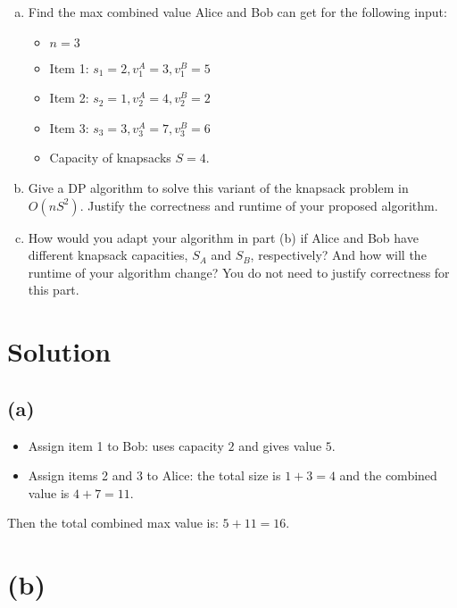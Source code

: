 \documentclass[11pt]{article}
\begin{document}
\begin{tcolorbox}[title={Problem 1 (Knapsack, Take II, 50 pts)}]
        \begin{enumerate}[(a)]
            \item Find the max combined value Alice and Bob can get for the following input:
            \begin{itemize}
                \item \( n = 3 \)
                \item Item 1: \( s_1 = 2, v_1^A = 3, v_1^B = 5 \)
                \item Item 2: \( s_2 = 1, v_2^A = 4, v_2^B = 2 \)
                \item Item 3: \( s_3 = 3, v_3^A = 7, v_3^B = 6 \)
                \item Capacity of knapsacks \(S = 4\).
            \end{itemize} 
            \item Give a DP algorithm to solve this variant of the knapsack problem in $O(nS^2)$. Justify the correctness and runtime of your proposed algorithm. 
            \item How would you adapt your algorithm in part (b) if Alice and Bob have different knapsack capacities, \(S_A\) and \(S_B\), respectively? And how will the runtime of your algorithm change? You do not need to justify correctness for this part.
        \end{enumerate}
    \end{tcolorbox}

    \section*{Solution}

    \subsection*{(a)}
    \begin{itemize}
        \item Assign item 1 to Bob: uses capacity \(2\) and gives value \(5\).
        \item Assign items 2 and 3 to Alice: the total size is \(1+3=4\) and the combined value is \(4+7=11\).
    \end{itemize}
    Then the total combined max value is: \(5 + 11 = 16\).
    
    \section*{(b)}
\end{document}
